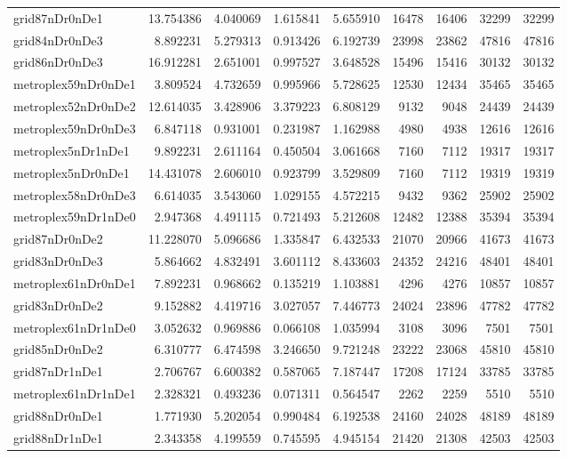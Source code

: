 \begin{longtable}{|l|r|r|r|r|r|r|r|r|}
grid87nDr0nDe1 & 13.754386 & 4.040069 & 1.615841 & 5.655910 & 16478 & 16406 & 32299 & 32299 \\
grid84nDr0nDe3 & 8.892231 & 5.279313 & 0.913426 & 6.192739 & 23998 & 23862 & 47816 & 47816 \\
grid86nDr0nDe3 & 16.912281 & 2.651001 & 0.997527 & 3.648528 & 15496 & 15416 & 30132 & 30132 \\
metroplex59nDr0nDe1 & 3.809524 & 4.732659 & 0.995966 & 5.728625 & 12530 & 12434 & 35465 & 35465 \\
metroplex52nDr0nDe2 & 12.614035 & 3.428906 & 3.379223 & 6.808129 & 9132 & 9048 & 24439 & 24439 \\
metroplex59nDr0nDe3 & 6.847118 & 0.931001 & 0.231987 & 1.162988 & 4980 & 4938 & 12616 & 12616 \\
metroplex5nDr1nDe1 & 9.892231 & 2.611164 & 0.450504 & 3.061668 & 7160 & 7112 & 19317 & 19317 \\
metroplex5nDr0nDe1 & 14.431078 & 2.606010 & 0.923799 & 3.529809 & 7160 & 7112 & 19319 & 19319 \\
metroplex58nDr0nDe3 & 6.614035 & 3.543060 & 1.029155 & 4.572215 & 9432 & 9362 & 25902 & 25902 \\
metroplex59nDr1nDe0 & 2.947368 & 4.491115 & 0.721493 & 5.212608 & 12482 & 12388 & 35394 & 35394 \\
grid87nDr0nDe2 & 11.228070 & 5.096686 & 1.335847 & 6.432533 & 21070 & 20966 & 41673 & 41673 \\
grid83nDr0nDe3 & 5.864662 & 4.832491 & 3.601112 & 8.433603 & 24352 & 24216 & 48401 & 48401 \\
metroplex61nDr0nDe1 & 7.892231 & 0.968662 & 0.135219 & 1.103881 & 4296 & 4276 & 10857 & 10857 \\
grid83nDr0nDe2 & 9.152882 & 4.419716 & 3.027057 & 7.446773 & 24024 & 23896 & 47782 & 47782 \\
metroplex61nDr1nDe0 & 3.052632 & 0.969886 & 0.066108 & 1.035994 & 3108 & 3096 & 7501 & 7501 \\
grid85nDr0nDe2 & 6.310777 & 6.474598 & 3.246650 & 9.721248 & 23222 & 23068 & 45810 & 45810 \\
grid87nDr1nDe1 & 2.706767 & 6.600382 & 0.587065 & 7.187447 & 17208 & 17124 & 33785 & 33785 \\
metroplex61nDr1nDe1 & 2.328321 & 0.493236 & 0.071311 & 0.564547 & 2262 & 2259 & 5510 & 5510 \\
grid88nDr0nDe1 & 1.771930 & 5.202054 & 0.990484 & 6.192538 & 24160 & 24028 & 48189 & 48189 \\
grid88nDr1nDe1 & 2.343358 & 4.199559 & 0.745595 & 4.945154 & 21420 & 21308 & 42503 & 42503 \\

\end{longtable}
